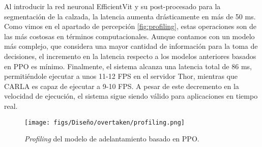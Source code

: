 Al introducir la red neuronal EfficientVit y su post-procesado para la segmentación de la calzada, la latencia aumenta drásticamente en más de 50 ms. Como vimos en el apartado de percepción \ref{fig:profiling}, estas operaciones son de las más costosas en términos computacionales. Aunque contamos con un modelo más complejo, que considera una mayor cantidad de información para la toma de decisiones, el incremento en la latencia respecto a los modelos anteriores basados en \ac{PPO} es mínimo. Finalmente, el sistema alcanza una latencia total de 86 ms, permitiéndole ejecutar a unos 11-12 \ac{FPS} en el servidor Thor, mientras que CARLA  es capaz de ejecutar a 9-10 \ac{FPS}. A pesar de este decremento en la velocidad de ejecución, el sistema sigue siendo válido para aplicaciones en tiempo real.
\begin{figure}[ht]
\centering
\texttt{[image: figs/Diseño/overtaken/profiling.png]}
\caption{\textit{Profiling} del modelo de adelantamiento basado en \ac{PPO}.}
\label{fig:profiling_overtaken}
\end{figure}

